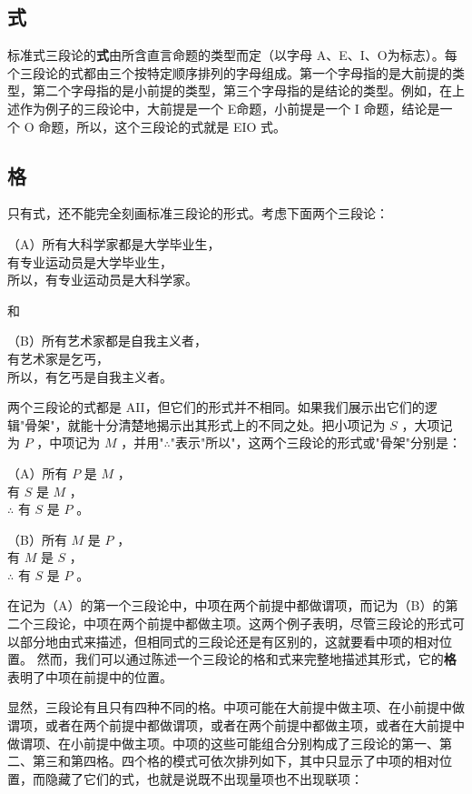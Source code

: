 \subsection{式}
标准式三段论的\textbf{式}由所含直言命题的类型而定（以字母 A、E、I、O为标志）。每个三段论的式都由三个按特定顺序排列的字母组成。第一个字母指的是大前提的类型，第二个字母指的是小前提的类型，第三个字母指的是结论的类型。例如，在上述作为例子的三段论中，大前提是一个 E命题，小前提是一个 I 命题，结论是一个 O 命题，所以，这个三段论的式就是 EIO 式。

\subsection{格}
只有式，还不能完全刻画标准三段论的形式。考虑下面两个三段论：

（A）所有大科学家都是大学毕业生，\\
有专业运动员是大学毕业生，\\
所以，有专业运动员是大科学家。

和

（B）所有艺术家都是自我主义者，\\
有艺术家是乞丐，\\
所以，有乞丐是自我主义者。

两个三段论的式都是 AII，但它们的形式并不相同。如果我们展示出它们的逻辑"骨架"，就能十分清楚地揭示出其形式上的不同之处。把小项记为 $S$ ，大项记为 $P$ ，中项记为 $M$ ，并用"$\therefore$"表示"所以"，这两个三段论的形式或"骨架"分别是：

（A）所有 $P$ 是 $M$ ，\\
有 $S$ 是 $M$ ，\\
$\therefore$ 有 $S$ 是 $P$ 。

（B）所有 $M$ 是 $P$ ，\\
有 $M$ 是 $S$ ，\\
$\therefore$ 有 $S$ 是 $P$ 。

在记为（A）的第一个三段论中，中项在两个前提中都做谓项，而记为（B）的第二个三段论，中项在两个前提中都做主项。这两个例子表明，尽管三段论的形式可以部分地由式来描述，但相同式的三段论还是有区别的，这就要看中项的相对位置。\cite{lukasiewicz1957} 然而，我们可以通过陈述一个三段论的格和式来完整地描述其形式，它的\textbf{格}表明了中项在前提中的位置。

显然，三段论有且只有四种不同的格。中项可能在大前提中做主项、在小前提中做谓项，或者在两个前提中都做谓项，或者在两个前提中都做主项，或者在大前提中做谓项、在小前提中做主项。中项的这些可能组合分别构成了三段论的第一、第二、第三和第四格。四个格的模式可依次排列如下，其中只显示了中项的相对位置，而隐藏了它们的式，也就是说既不出现量项也不出现联项：

